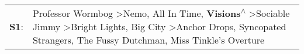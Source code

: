 \begin{supertabular}{p{0.03\textwidth}p{0.92\textwidth}}
 \textbf{S1}:  &  Professor Wormbog\textsuperscript{} \textgreater \enspace Nemo\textsuperscript{}, \enspace All In Time\textsuperscript{}, \enspace \textbf{Visions\textsuperscript{$\wedge$}} \textgreater \enspace Sociable Jimmy\textsuperscript{} \textgreater \enspace Bright Lights, Big City\textsuperscript{} \textgreater \enspace Anchor Drops\textsuperscript{}, \enspace Syncopated Strangers\textsuperscript{}, \enspace The Fussy Dutchman\textsuperscript{}, \enspace Miss Tinkle's Overture\textsuperscript{}  \enspace  \\
\end{supertabular}
